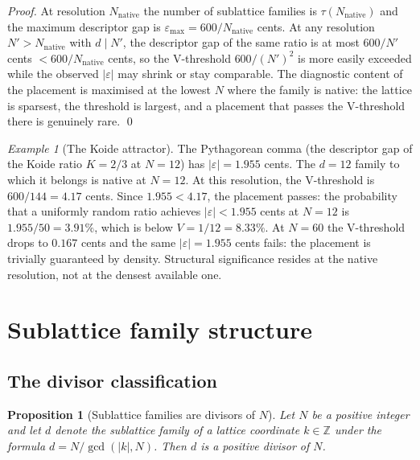 \documentclass[11pt,a4paper]{article}
\newtheorem{proposition}[theorem]{Proposition}
\theoremstyle{definition}
\theoremstyle{remark}
\newtheorem{example}[theorem]{Example}
\newcommand{\Z}{\mathbb{Z}}
\begin{document}
\begin{proof}
At resolution $N_{\mathrm{native}}$ the number of sublattice families is $\tau(N_{\mathrm{native}})$ and the maximum descriptor gap is $\varepsilon_{\max} = 600/N_{\mathrm{native}}$ cents. At any resolution $N' > N_{\mathrm{native}}$ with $d \mid N'$, the descriptor gap of the same ratio is at most $600/N'$ cents $< 600/N_{\mathrm{native}}$ cents, so the V-threshold $600/(N')^{2}$ is more easily exceeded while the observed $|\varepsilon|$ may shrink or stay comparable. The diagnostic content of the placement is maximised at the lowest $N$ where the family is native: the lattice is sparsest, the threshold is largest, and a placement that passes the V-threshold there is genuinely rare. \qed
\end{proof}

\begin{example}[The Koide attractor]\label{ex:koide-v-threshold}
The Pythagorean comma (the descriptor gap of the Koide ratio $K=2/3$ at $N=12$) has $|\varepsilon| = 1.955$ cents. The $d=12$ family to which it belongs is native at $N=12$. At this resolution, the V-threshold is $600/144 = 4.17$ cents. Since $1.955 < 4.17$, the placement passes: the probability that a uniformly random ratio achieves $|\varepsilon| < 1.955$ cents at $N=12$ is $1.955/50 = 3.91\%$, which is below $V = 1/12 = 8.33\%$. At $N=60$ the V-threshold drops to $0.167$ cents and the same $|\varepsilon| = 1.955$ cents fails: the placement is trivially guaranteed by density. Structural significance resides at the native resolution, not at the densest available one.
\end{example}

\section{Sublattice family structure}\label{sec:sublattice}

\subsection{The divisor classification}

\begin{proposition}[Sublattice families are divisors of $N$]\label{prop:divisors}
Let $N$ be a positive integer and let $d$ denote the sublattice family of a lattice coordinate $k\in\Z$ under the formula $d=N/\gcd(|k|,N)$. Then $d$ is a positive divisor of $N$.
\end{proposition}
\end{document}
